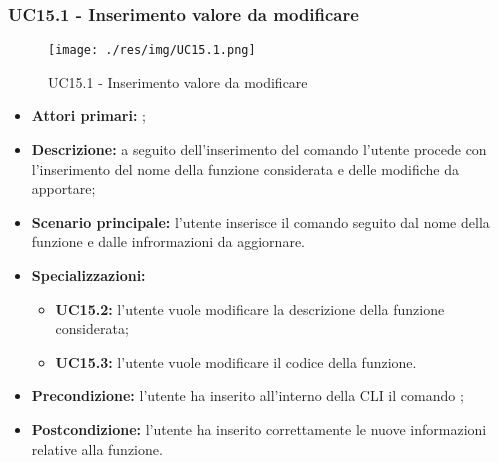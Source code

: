 \subsubsection{UC15.1 - Inserimento valore da modificare}
\begin{figure}[h]
	\centering
	\texttt{[image: ./res/img/UC15.1.png]}
	\caption {UC15.1 - Inserimento valore da modificare}
\end{figure}
\begin{itemize}
	\item \textbf{Attori primari:} \us{};
	\item \textbf{Descrizione:} a seguito dell'inserimento del comando \edit{} l’utente procede con l’inserimento del nome della funzione considerata e delle modifiche da apportare; 
	\item \textbf{Scenario principale:} l'utente inserisce il comando \edit{} seguito dal nome della funzione e dalle infrormazioni da aggiornare. 
	\item \textbf{Specializzazioni:} 
	\begin{itemize}
		\item \textbf{UC15.2:} l’utente vuole modificare la descrizione della funzione considerata; 
		\item \textbf{UC15.3:} l’utente vuole modificare il codice della funzione. 
	\end{itemize}
	\item \textbf{Precondizione:} l’utente ha inserito all’interno della CLI il comando \edit{}; 
	\item \textbf{Postcondizione:} l’utente ha inserito correttamente le nuove informazioni relative alla funzione.
\end{itemize}